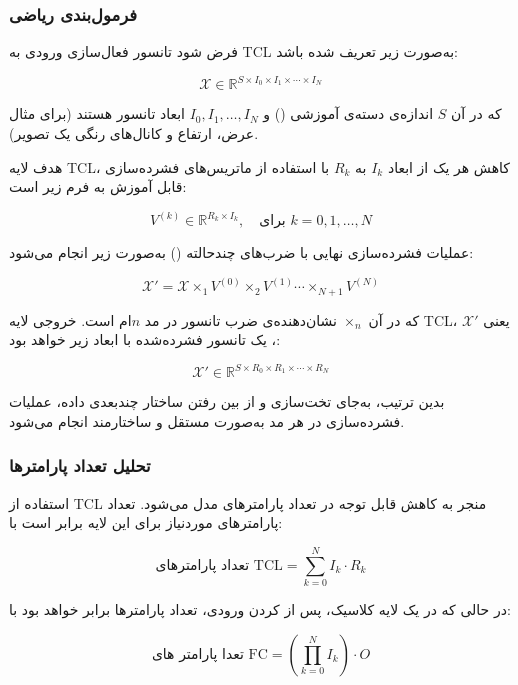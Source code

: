 \subsubsection*{فرمول‌بندی ریاضی}

فرض شود تانسور فعال‌سازی ورودی به TCL به‌صورت زیر تعریف شده باشد:

\[
\mathcal{X} \in \mathbb{R}^{S \times I_0 \times I_1 \times \cdots \times I_N}
\]

که در آن $S$ اندازه‌ی دسته‌ی آموزشی () و $I_0, I_1, \dots, I_N$ ابعاد تانسور هستند (برای مثال عرض، ارتفاع و کانال‌های رنگی یک تصویر).

هدف لایه TCL، کاهش هر یک از ابعاد $I_k$ به $R_k$ با استفاده از ماتریس‌های فشرده‌سازی قابل آموزش به فرم زیر است:

\[
V^{(k)} \in \mathbb{R}^{R_k \times I_k}, \quad \text{برای } k = 0, 1, \dots, N
\]

عملیات فشرده‌سازی نهایی با ضرب‌های چندحالته () به‌صورت زیر انجام می‌شود:

\[
\mathcal{X}' = \mathcal{X} \times_1 V^{(0)} \times_2 V^{(1)} \cdots \times_{N+1} V^{(N)}
\]

که در آن $\times_n$ نشان‌دهنده‌ی ضرب تانسور در مد $n$ام است. خروجی لایه TCL، یعنی $\mathcal{X}'$، یک تانسور فشرده‌شده با ابعاد زیر خواهد بود:

\[
\mathcal{X}' \in \mathbb{R}^{S \times R_0 \times R_1 \times \cdots \times R_N}
\]

بدین ترتیب، به‌جای تخت‌سازی و از بین رفتن ساختار چندبعدی داده، عملیات فشرده‌سازی در هر مد به‌صورت مستقل و ساختارمند انجام می‌شود.







\subsubsection*{تحلیل تعداد پارامترها}

استفاده از TCL منجر به کاهش قابل توجه در تعداد پارامترهای مدل می‌شود. تعداد پارامترهای موردنیاز برای این لایه برابر است با:

\[
\text{تعداد پارامترهای TCL} = \sum_{k=0}^{N} I_k \cdot R_k
\]

در حالی که در یک لایه  کلاسیک، پس از  کردن ورودی، تعداد پارامترها برابر خواهد بود با:

\[
\text{تعدا پارامتر های FC} = \left( \prod_{k=0}^{N} I_k \right) \cdot O
\]

